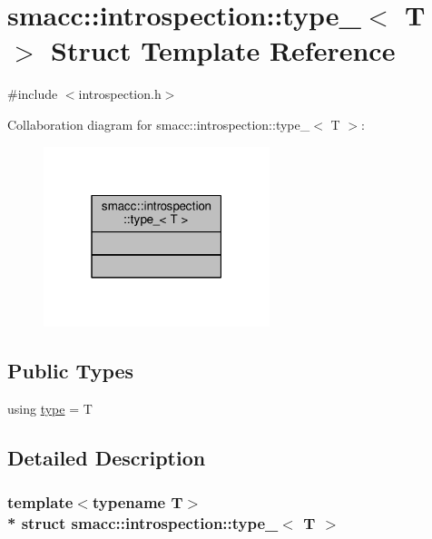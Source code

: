 \hypertarget{structsmacc_1_1introspection_1_1type__}{}\section{smacc\+:\+:introspection\+:\+:type\+\_\+$<$ T $>$ Struct Template Reference}
\label{structsmacc_1_1introspection_1_1type__}


{\ttfamily \#include $<$introspection.\+h$>$}



Collaboration diagram for smacc\+:\+:introspection\+:\+:type\+\_\+$<$ T $>$\+:\nopagebreak
\begin{figure}[H]
\begin{center}
\leavevmode
\includegraphics[width=187pt]{structsmacc_1_1introspection_1_1type____coll__graph}
\end{center}
\end{figure}
\subsection*{Public Types}
\begin{DoxyCompactItemize}
\item 
using \hyperlink{structsmacc_1_1introspection_1_1type___afe9e4516cea9d3160f2eff1b787ca4f5}{type} = T
\end{DoxyCompactItemize}


\subsection{Detailed Description}
\subsubsection*{template$<$typename T$>$\\*
struct smacc\+::introspection\+::type\+\_\+$<$ T $>$}



